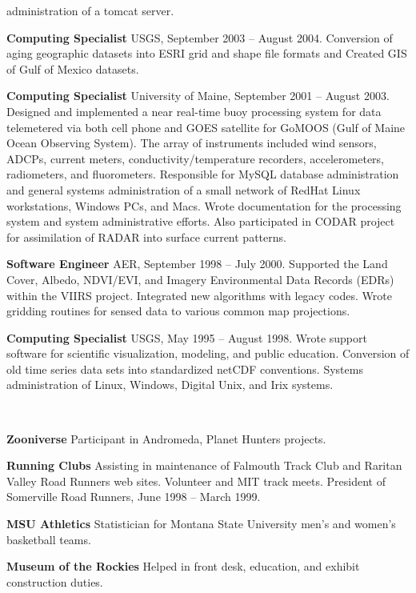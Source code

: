 \documentclass[11pt]{article}  %
\begin{document}
\begin{compactitem}
    administration of a tomcat server.
  \item {\bf Computing Specialist}
    USGS, September 2003 -- August 2004.  
    Conversion of aging geographic datasets into ESRI grid and shape
    file formats and Created GIS of Gulf of Mexico datasets.
  \item {\bf Computing Specialist}
    University of Maine, September 2001 -- August 2003.
    Designed and implemented a near real-time buoy processing
    system for data telemetered via both cell phone and GOES satellite
    for GoMOOS (Gulf of Maine Ocean Observing System).   The array
    of instruments included wind sensors, ADCPs, current meters,
    conductivity/temperature recorders, accelerometers, radiometers,
    and fluorometers.   Responsible for MySQL database administration
    and general systems administration of a small network of RedHat
    Linux workstations, Windows PCs, and Macs.   Wrote documentation
    for the processing system and system administrative efforts.
    Also participated in CODAR project for assimilation of RADAR into
    surface current patterns.
  \item {\bf Software Engineer}
    AER, September 1998 -- July 2000.  Supported the Land Cover, Albedo,
    NDVI/EVI, and Imagery Environmental Data Records (EDRs) within the
    VIIRS project. Integrated new algorithms with legacy codes. Wrote
    gridding routines for sensed data to various common map projections.
  \item {\bf Computing Specialist}
    USGS, May 1995 -- August 1998.  Wrote support software for scientific
    visualization, modeling, and public education. Conversion of old
    time series data sets into standardized netCDF conventions.  Systems
    administration of Linux, Windows, Digital Unix, and Irix systems.
\end{compactitem}

\bigskip 
{}\\ 
\begin{compactitem}
  \item {\bf Zooniverse} Participant in Andromeda, Planet Hunters projects.
  \item {\bf Running Clubs} Assisting in maintenance of Falmouth Track Club and
    Raritan Valley Road Runners web sites.  Volunteer and MIT track meets.
    President of Somerville Road Runners, June 1998 -- March 1999.
  \item {\bf MSU Athletics} Statistician for Montana State University men's and
    women's basketball teams.
  \item {\bf Museum of the Rockies} Helped in front desk, education, and exhibit
    construction duties.
\end{compactitem}
\end{document}
